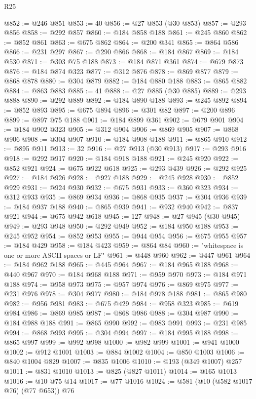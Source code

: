 \begin{lexlean}{R25}
\begin{coremodule}
@852 := @246 @851
@853 := 40
@856 := @27 @853 (@30 @853)
@857 := @293 @856
@858 := @292 @857
@860 := @184 @858 @188
@861 := @245 @860
@862 := @852 @861
@863 := @675 @862
@864 := @200 @341
@865 := @864 @586
@866 := @231 @297
@867 := @290 @866
@868 := @184 @867
@869 := @184 @530
@871 := @303 @75 @188
@873 := @184 @871 @361
@874 := @679 @873
@876 := @184 @874 @323
@877 := @312 @876
@878 := @869 @877
@879 := @868 @878
@880 := @304 @879
@882 := @184 @880 @188
@883 := @865 @882
@884 := @863 @883
@885 := 41
@888 := @27 @885 (@30 @885)
@889 := @293 @888
@890 := @292 @889
@892 := @184 @890 @188
@893 := @245 @892
@894 := @852 @893
@895 := @675 @894
@896 := @301 @82
@897 := @200 @896
@899 := @897 @75 @188
@901 := @184 @899 @361
@902 := @679 @901
@904 := @184 @902 @323
@905 := @312 @904
@906 := @869 @905
@907 := @868 @906
@908 := @304 @907
@910 := @184 @908 @188
@911 := @865 @910
@912 := @895 @911
@913 := 32
@916 := @27 @913 (@30 @913)
@917 := @293 @916
@918 := @292 @917
@920 := @184 @918 @188
@921 := @245 @920
@922 := @852 @921
@924 := @675 @922 @618
@925 := @293 @439
@926 := @292 @925
@927 := @184 @926
@928 := @927 @188
@929 := @245 @928
@930 := @852 @929
@931 := @924 @930
@932 := @675 @931
@933 := @360 @323
@934 := @312 @933
@935 := @869 @934
@936 := @868 @935
@937 := @304 @936
@939 := @184 @937 @188
@940 := @865 @939
@941 := @932 @940
@942 := @837 @921
@944 := @675 @942 @618
@945 := 127
@948 := @27 @945 (@30 @945)
@949 := @293 @948
@950 := @292 @949
@952 := @184 @950 @188
@953 := @245 @952
@954 := @852 @953
@955 := @944 @954
@956 := @675 @955
@957 := @184 @429
@958 := @184 @423
@959 := @864 @84
@960 := "whitespace is one or more ASCII spaces or LF"
@961 := @448 @960
@962 := @447 @961
@964 := @184 @962 @188
@965 := @445 @964
@967 := @184 @965 @188
@968 := @440 @967
@970 := @184 @968 @188
@971 := @959 @970
@973 := @184 @971 @188
@974 := @958 @973
@975 := @957 @974
@976 := @869 @975
@977 := @231 @976
@978 := @304 @977
@980 := @184 @978 @188
@981 := @865 @980
@982 := @956 @981
@983 := @675 @429
@984 := @958 @323
@985 := @619 @984
@986 := @869 @985
@987 := @868 @986
@988 := @304 @987
@990 := @184 @988 @188
@991 := @865 @990
@992 := @983 @991
@993 := @231 @985
@994 := @868 @993
@995 := @304 @994
@997 := @184 @995 @188
@998 := @865 @997
@999 := @992 @998
@1000 := @982 @999
@1001 := @941 @1000
@1002 := @912 @1001
@1003 := @884 @1002
@1004 := @850 @1003
@1006 := @840 @1004 @829
@1007 := @835 @1006
@1010 := @193 (@349 @1007) @257
@1011 := @831 @1010
@1013 := @825 (@827 @1011)
@1014 := @165 @1013
@1016 := @10 @75 @14
@1017 := @77 @1016
@1024 := @581 (@10 (@582 @1017 @76) (@77 @653)) @76

\end{coremodule}
\end{lexlean}
